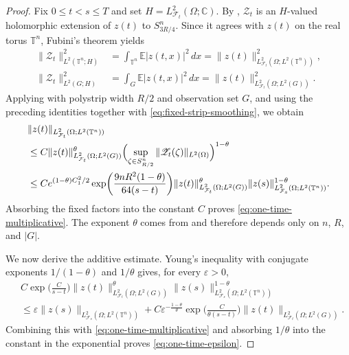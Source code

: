 \documentclass[print,wide]{draft}
\begin{document}
%
\begin{proof}
Fix \(0\le t<s\le T\) and set
\(H=L^2_{\mathcal F_t}(\Omega;\mathbb C)\).
By , \(\mathscr Z_t\) is an \(H\)-valued
holomorphic extension of \(z(t)\) to \(S_{3R/4}^n\).
Since it agrees with \(z(t)\) on the real torus \(\mathbb T^n\), Fubini's theorem yields
\begin{align*}
\|\mathscr Z_t\|_{L^2(\mathbb T^n;H)}^2
&=\int_{\mathbb T^n}\mathbb E|z(t,x)|^2\,dx
=\|z(t)\|_{L^2_{\mathcal F_t}(\Omega;L^2(\mathbb T^n))}^2,\\
\|\mathscr Z_t\|_{L^2(G;H)}^2
&=\int_G\mathbb E|z(t,x)|^2\,dx
=\|z(t)\|_{L^2_{\mathcal F_t}(\Omega;L^2(G))}^2.
\end{align*}
Applying  with polystrip width \(R/2\)
and observation set \(G\), and using the preceding identities together with
\eqref{eq:fixed-strip-smoothing}, we obtain
\begin{align*}
&\|z(t)\|_{L^2_{\mathcal F_t}(\Omega;L^2(\mathbb T^n))}\\
&\leq C\|z(t)\|_{L^2_{\mathcal F_t}(\Omega;L^2(G))}^\theta
\Bigl(\sup_{\zeta\in S_{R/2}^n}\|\mathscr Z_t(\zeta)\|_{L^2(\Omega)}\Bigr)^{1-\theta}\\
&\leq C e^{(1-\theta)C_1^2/2}
\exp\biggl(\frac{9nR^2(1-\theta)}{64(s-t)}\biggr)
\|z(t)\|_{L^2_{\mathcal F_t}(\Omega;L^2(G))}^\theta
\|z(s)\|_{L^2_{\mathcal F_s}(\Omega;L^2(\mathbb T^n))}^{1-\theta}.
\end{align*}
Absorbing the fixed factors into the constant \(C\) proves
\eqref{eq:one-time-multiplicative}. The exponent \(\theta\) comes from
 and therefore depends only on \(n\), \(R\),
and \(|G|\).

We now derive the additive estimate. Young's inequality with conjugate
exponents \(1/(1-\theta)\) and \(1/\theta\) gives, for every \(\varepsilon>0\),
\begin{align*}
&C\exp\biggl(\frac{C}{s-t}\biggr)
\|z(t)\|_{L^2_{\mathcal F_t}(\Omega;L^2(G))}^\theta
\|z(s)\|_{L^2_{\mathcal F_s}(\Omega;L^2(\mathbb T^n))}^{1-\theta}\\
&\leq \varepsilon
\|z(s)\|_{L^2_{\mathcal F_s}(\Omega;L^2(\mathbb T^n))}
+C\varepsilon^{-\frac{1-\theta}{\theta}}
\exp\biggl(\frac{C}{\theta(s-t)}\biggr)
\|z(t)\|_{L^2_{\mathcal F_t}(\Omega;L^2(G))}.
\end{align*}
Combining this with \eqref{eq:one-time-multiplicative} and absorbing
\(1/\theta\) into the constant in the exponential proves
\eqref{eq:one-time-epsilon}.
\end{proof}
\end{document}
